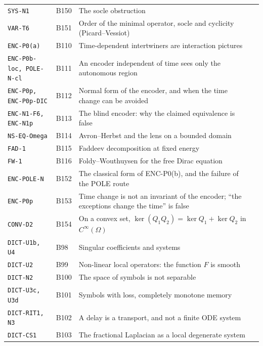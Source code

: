 \documentclass[11pt,a4paper,oneside]{report}
\begin{document}
\begin{center}
\begin{longtable}{@{}L{3.6cm}L{1.2cm}L{8.0cm}L{1.2cm}@{}}
\texttt{SYS-N1} & B150 & The socle obstruction & \pageref{dim:SYS-N1}\\
\texttt{VAR-T6} & B151 & Order of the minimal operator, socle and cyclicity (Picard--Vessiot) & \pageref{dim:VAR-T6}\\
\texttt{ENC-P0(a)} & B110 & Time-dependent intertwiners are interaction pictures & \pageref{dim:ENC-P0(a)}\\
\texttt{ENC-P0b-loc, POLE-N-cl} & B111 & An encoder independent of time sees only the autonomous region & \pageref{dim:ENC-P0b-loc, POLE-N-cl}\\
\texttt{ENC-P0p, ENC-P0p-DIC} & B112 & Normal form of the encoder, and when the time change can be avoided & \pageref{dim:ENC-P0p, ENC-P0p-DIC}\\
\texttt{ENC-N1-F6, ENC-N1p} & B113 & The blind encoder: why the claimed equivalence is false & \pageref{dim:ENC-N1-F6, ENC-N1p}\\
\texttt{NS-EQ-Omega} & B114 & Avron--Herbst and the lens on a bounded domain & \pageref{dim:NS-EQ-Omega}\\
\texttt{FAD-1} & B115 & Faddeev decomposition at fixed energy & \pageref{dim:FAD-1}\\
\texttt{FW-1} & B116 & Foldy--Wouthuysen for the free Dirac equation & \pageref{dim:FW-1}\\
\texttt{ENC-POLE-N} & B152 & The classical form of ENC-P0(b), and the failure of the POLE route & \pageref{dim:ENC-POLE-N}\\
\texttt{ENC-P0p} & B153 & Time change is not an invariant of the encoder; ``the exceptions change the time'' is false & \pageref{dim:ENC-P0p}\\
\texttt{CONV-D2} & B154 & On a convex set, $\ker(Q_1Q_2)=\ker Q_1+\ker Q_2$ in $C^\infty(\Omega)$ & \pageref{dim:CONV-D2}\\
\texttt{DICT-U1b, U4} & B98 & Singular coefficients and systems & \pageref{dim:DICT-U1b, U4}\\
\texttt{DICT-U2} & B99 & Non-linear local operators: the function $F$ is smooth & \pageref{dim:DICT-U2}\\
\texttt{DICT-N2} & B100 & The space of symbols is not separable & \pageref{dim:DICT-N2}\\
\texttt{DICT-U3c, U3d} & B101 & Symbols with loss, completely monotone memory & \pageref{dim:DICT-U3c, U3d}\\
\texttt{DICT-RIT1, N3} & B102 & A delay is a transport, and not a finite ODE system & \pageref{dim:DICT-RIT1, N3}\\
\texttt{DICT-CS1} & B103 & The fractional Laplacian as a local degenerate system & \pageref{dim:DICT-CS1}\\

\end{longtable}
\end{center}
\end{document}
